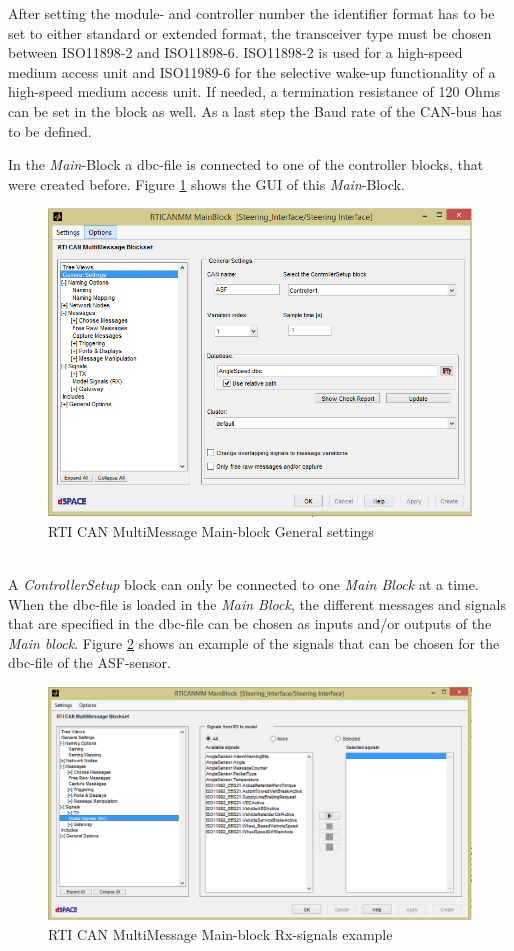 \documentclass[ExampleMasters.tex]{subfiles}
\begin{document}
After setting the module- and controller number the identifier format has to be set to either standard or extended format, the transceiver type must be chosen between ISO11898-2 and ISO11898-6. ISO11898-2 is used for a high-speed medium access unit and ISO11989-6 for the selective wake-up functionality of a high-speed medium access unit. If needed, a termination resistance of 120 Ohms can be set in the block as well. As a last step the Baud rate of the \gls{CAN}-bus has to be defined.

In the \textit{Main}-Block a \gls{dbc}-file is connected to one of the controller blocks, that were created before. Figure \ref{fig:RTI_Main} shows the \gls{GUI} of this \textit{Main}-Block. 
\begin{figure}[!htb]
	\centering
	\includegraphics[width=0.8\linewidth]{figures/RTI_Main}
	
	\caption[\acrshort{RTI} \acrshort{CAN} MultiMessage Main-block General settings]{\gls{RTI} \gls{CAN} MultiMessage Main-block General settings}
	\label{fig:RTI_Main}
\end{figure} \\
A \textit{ControllerSetup} block can only be connected to one \textit{Main Block} at a time. When the \gls{dbc}-file is loaded in the \textit{Main Block}, the different messages and signals that are specified in the \gls{dbc}-file can be chosen as inputs and/or outputs of the \textit{Main block}. Figure \ref{fig:RTI_Main_signals} shows an example of the signals that can be chosen for the \gls{dbc}-file of the \gls{ASF}-sensor.  
\begin{figure}[!htb]
	\centering
	\includegraphics[width=0.8\linewidth]{figures/RTI_Main_signals}
	
	\caption[\acrshort{RTI} \acrshort{CAN} MultiMessage Main-block Rx-signals example]{\gls{RTI} \gls{CAN} MultiMessage Main-block Rx-signals example}
	\label{fig:RTI_Main_signals}
\end{figure} \\
\end{document}
